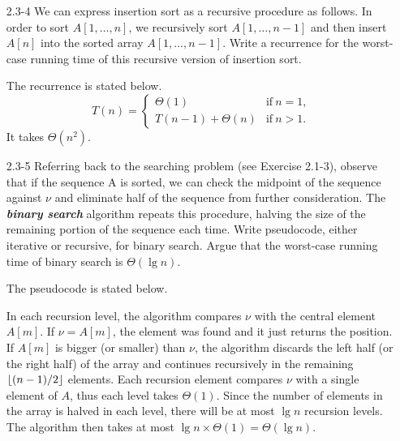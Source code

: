 \begin{enumerate}
\begin{framed}
\end{framed}

\item[2.3{-}4]{We can express insertion sort as a recursive procedure as
follows. In order to sort $A[1, \dots, n]$, we recursively sort $A[1, \dots,
n - 1]$ and then insert $A[n]$ into the sorted array $A[1, \dots, n - 1]$. Write
a recurrence for the worst-case running time of this recursive version of
insertion sort.}

\begin{framed}
The recurrence is stated below.
\begin{equation*}
  T(n) =
    \begin{cases}
      \Theta(1) & \text{if}\ n=1 \text{,} \\
      T(n - 1) + \Theta(n) & \text{if}\ n > 1\text{.}
    \end{cases}
\end{equation*}
It takes $\Theta(n^2)$.
\end{framed}

\item[2.3{-}5]{Referring back to the searching problem (see Exercise 2.1-3),
observe that if the sequence A is sorted, we can check the midpoint of the
sequence against $\nu$ and eliminate half of the sequence from further
consideration. The \textbf{\emph{binary search}} algorithm repeats this
procedure, halving the size of the remaining portion of the sequence each time.
Write pseudocode, either iterative or recursive, for binary search. Argue that
the worst-case running time of binary search is $\Theta(\lg n)$.}

\begin{framed}
The pseudocode is stated below.\\
\begin{algorithm}[H]
\SetAlgoNoEnd\DontPrintSemicolon
\BlankLine
{}
\end{algorithm}

In each recursion level, the algorithm compares $\nu$ with the central element
$A[m]$. If $\nu = A[m]$, the element was found and it just returns the position.
If $A[m]$ is bigger (or smaller) than $\nu$, the algorithm discards the left
half (or the right half) of the array and continues recursively in the remaining
$\lfloor(n - 1) / 2\rfloor$ elements. Each recursion element compares $\nu$ with
a single element of $A$, thus each level takes $\Theta(1)$. Since the number of
elements in the array is halved in each level, there will be at most $\lg n$
recursion levels. The algorithm then takes at most
$\lg n \times \Theta(1) = \Theta(\lg n)$.
\end{framed}


\end{enumerate}
